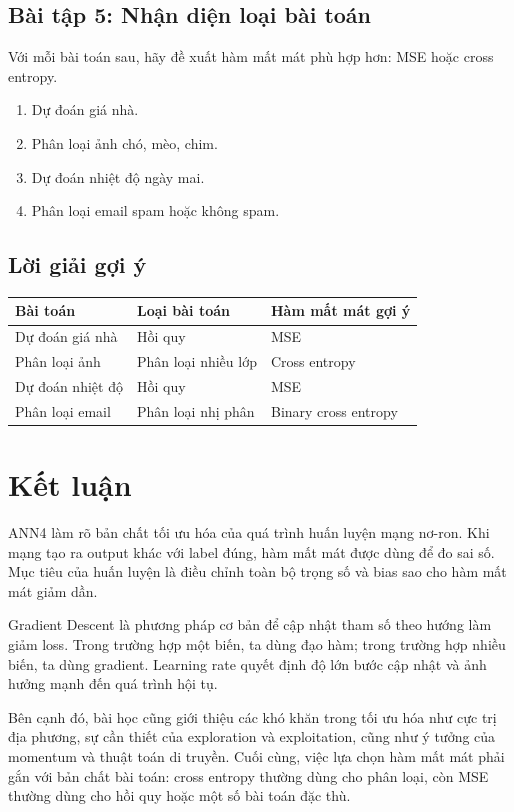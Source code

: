 \subsection*{Bài tập 5: Nhận diện loại bài toán}

Với mỗi bài toán sau, hãy đề xuất hàm mất mát phù hợp hơn: MSE hoặc cross entropy.

\begin{enumerate}
    \item Dự đoán giá nhà.
    \item Phân loại ảnh chó, mèo, chim.
    \item Dự đoán nhiệt độ ngày mai.
    \item Phân loại email spam hoặc không spam.
\end{enumerate}

\subsection*{Lời giải gợi ý}

\begin{center}
\begin{tabular}{lll}
\toprule
Bài toán & Loại bài toán & Hàm mất mát gợi ý \\
\midrule
Dự đoán giá nhà & Hồi quy & MSE \\
Phân loại ảnh & Phân loại nhiều lớp & Cross entropy \\
Dự đoán nhiệt độ & Hồi quy & MSE \\
Phân loại email & Phân loại nhị phân & Binary cross entropy \\
\bottomrule
\end{tabular}
\end{center}

\section*{Kết luận}

ANN4 làm rõ bản chất tối ưu hóa của quá trình huấn luyện mạng nơ-ron. Khi mạng tạo ra output khác với label đúng, hàm mất mát được dùng để đo sai số. Mục tiêu của huấn luyện là điều chỉnh toàn bộ trọng số và bias sao cho hàm mất mát giảm dần.

Gradient Descent là phương pháp cơ bản để cập nhật tham số theo hướng làm giảm loss. Trong trường hợp một biến, ta dùng đạo hàm; trong trường hợp nhiều biến, ta dùng gradient. Learning rate quyết định độ lớn bước cập nhật và ảnh hưởng mạnh đến quá trình hội tụ.

Bên cạnh đó, bài học cũng giới thiệu các khó khăn trong tối ưu hóa như cực trị địa phương, sự cần thiết của exploration và exploitation, cũng như ý tưởng của momentum và thuật toán di truyền. Cuối cùng, việc lựa chọn hàm mất mát phải gắn với bản chất bài toán: cross entropy thường dùng cho phân loại, còn MSE thường dùng cho hồi quy hoặc một số bài toán đặc thù.

